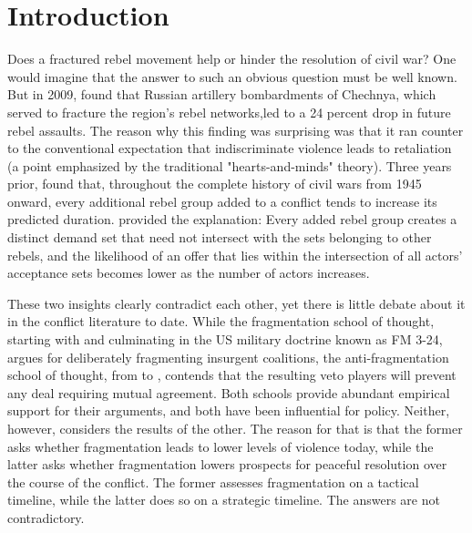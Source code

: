 \documentclass[12pt,a4paper]{article}
\begin{document}
\section{Introduction}
Does a fractured rebel movement help or hinder the resolution of civil war? One would imagine that the answer to such an obvious question must be well known. But in 2009, \citet{lyall2009} found that Russian artillery bombardments of Chechnya, which served to fracture the region’s rebel networks,led to a 24 percent drop in future rebel assaults. The reason why this finding was surprising was that it ran counter to the conventional expectation that indiscriminate violence leads to retaliation (a point emphasized by the traditional "hearts-and-minds" theory). Three years prior, \citet{cunningham2006} found that, throughout the complete history of civil wars from 1945 onward, every additional rebel group added to a conflict tends to increase its predicted duration. \citet{cunningham2009} provided the explanation: Every added rebel group creates a distinct demand set that need not intersect with the sets belonging to other rebels, and the likelihood of an offer that lies within the intersection of all actors' acceptance sets becomes lower as the number of actors increases.

These two insights clearly contradict each other, yet there is little debate about it in the conflict literature to date. While the fragmentation school of thought, starting with \citet{galula1964} and culminating in the US military doctrine known as FM 3-24, argues for deliberately fragmenting insurgent coalitions, the anti-fragmentation school of thought, from \citet{cunningham2006} to \citet{walter2002}, contends that the resulting veto players will prevent any deal requiring mutual agreement. Both schools provide abundant empirical support for their arguments, and both have been influential for policy. Neither, however, considers the results of the other. The reason for that is that the former asks whether fragmentation leads to lower levels of violence today, while the latter asks whether fragmentation lowers prospects for peaceful resolution over the course of the conflict. The former assesses fragmentation on a tactical timeline, while the latter does so on a strategic timeline. The answers are not contradictory.
\end{document}
